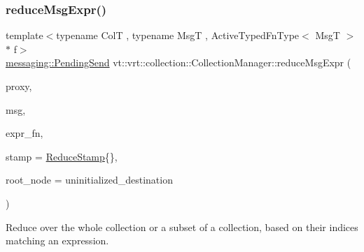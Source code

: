 \subsubsection{\texorpdfstring{reduce\+Msg\+Expr()}{reduceMsgExpr()}\hspace{0.1cm}{\footnotesize\ttfamily [1/2]}}
{\footnotesize\ttfamily template$<$typename ColT , typename MsgT , Active\+Typed\+Fn\+Type$<$ Msg\+T $>$ $\ast$ f$>$ \\
\hyperlink{structvt_1_1messaging_1_1_pending_send}{messaging\+::\+Pending\+Send} vt\+::vrt\+::collection\+::\+Collection\+Manager\+::reduce\+Msg\+Expr (\begin{DoxyParamCaption}\item[{\hyperlink{structvt_1_1vrt_1_1collection_1_1_collection_manager_a56458ed7f9bb22b631b9b3a745f42f94}{Collection\+Proxy\+Wrap\+Type}$<$ ColT $>$ const \&}]{proxy,  }\item[{MsgT $\ast$const}]{msg,  }\item[{\hyperlink{structvt_1_1vrt_1_1collection_1_1_collection_manager_a47a3227ae0195c15187e8dc8762f66c4}{Reduce\+Idx\+Func\+Type}$<$ typename Col\+T\+::\+Index\+Type $>$}]{expr\+\_\+fn,  }\item[{\hyperlink{structvt_1_1vrt_1_1collection_1_1_collection_manager_ae8aac19e0ae07e9225142e5880eac830}{Reduce\+Stamp}}]{stamp = {\ttfamily \hyperlink{structvt_1_1vrt_1_1collection_1_1_collection_manager_ae8aac19e0ae07e9225142e5880eac830}{Reduce\+Stamp}\{\}},  }\item[{\hyperlink{namespacevt_a866da9d0efc19c0a1ce79e9e492f47e2}{Node\+Type}}]{root\+\_\+node = {\ttfamily uninitialized\+\_\+destination} }\end{DoxyParamCaption})}



Reduce over the whole collection or a subset of a collection, based on their indices matching an expression. 


